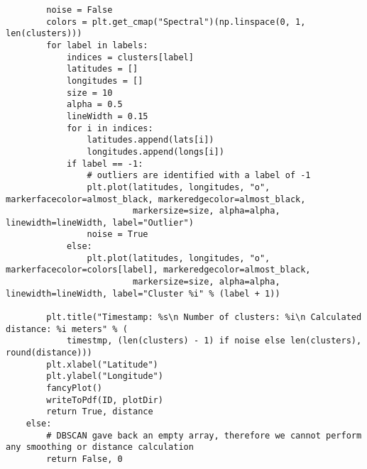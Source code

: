 \begin{verbatim}
        noise = False
        colors = plt.get_cmap("Spectral")(np.linspace(0, 1, len(clusters)))
        for label in labels:
            indices = clusters[label]
            latitudes = []
            longitudes = []
            size = 10
            alpha = 0.5
            lineWidth = 0.15
            for i in indices:
                latitudes.append(lats[i])
                longitudes.append(longs[i])
            if label == -1:
                # outliers are identified with a label of -1
                plt.plot(latitudes, longitudes, "o", markerfacecolor=almost_black, markeredgecolor=almost_black,
                         markersize=size, alpha=alpha, linewidth=lineWidth, label="Outlier")
                noise = True
            else:
                plt.plot(latitudes, longitudes, "o", markerfacecolor=colors[label], markeredgecolor=almost_black,
                         markersize=size, alpha=alpha, linewidth=lineWidth, label="Cluster %i" % (label + 1))

        plt.title("Timestamp: %s\n Number of clusters: %i\n Calculated distance: %i meters" % (
            timestmp, (len(clusters) - 1) if noise else len(clusters), round(distance)))
        plt.xlabel("Latitude")
        plt.ylabel("Longitude")
        fancyPlot()
        writeToPdf(ID, plotDir)
        return True, distance
    else:
        # DBSCAN gave back an empty array, therefore we cannot perform any smoothing or distance calculation
        return False, 0
\end{verbatim}